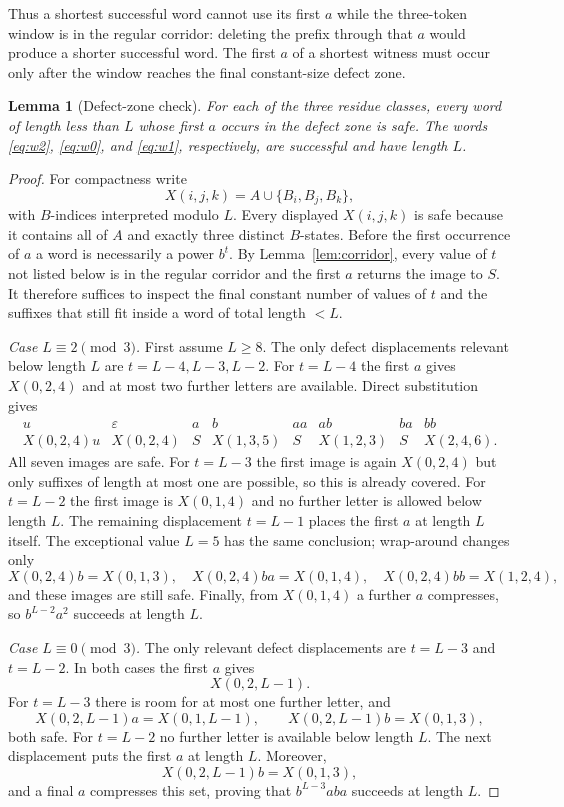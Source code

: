 \documentclass[11pt]{article}
\newtheorem{lemma}{Lemma}
\theoremstyle{definition}
\theoremstyle{remark}
\begin{document}
Thus a shortest successful word cannot use its first $a$ while the three-token window is in the regular corridor: deleting the prefix through that $a$ would produce a shorter successful word. The first $a$ of a shortest witness must occur only after the window reaches the final constant-size defect zone.

\begin{lemma}[Defect-zone check]\label{lem:defect}
For each of the three residue classes, every word of length less than $L$ whose first $a$ occurs in the defect zone is safe. The words \eqref{eq:w2}, \eqref{eq:w0}, and \eqref{eq:w1}, respectively, are successful and have length $L$.
\end{lemma}
\begin{proof}
For compactness write
\[
X(i,j,k)=A\cup\{B_i,B_j,B_k\},
\]
with $B$-indices interpreted modulo $L$. Every displayed $X(i,j,k)$ is safe because it contains all of $A$ and exactly three distinct $B$-states. Before the first occurrence of $a$ a word is necessarily a power $b^t$. By Lemma~\ref{lem:corridor}, every value of $t$ not listed below is in the regular corridor and the first $a$ returns the image to $S$. It therefore suffices to inspect the final constant number of values of $t$ and the suffixes that still fit inside a word of total length $<L$.

\smallskip
\noindent\emph{Case $L\equiv2\pmod3$.}
First assume $L\ge8$. The only defect displacements relevant below length $L$ are $t=L-4,L-3,L-2$. For $t=L-4$ the first $a$ gives $X(0,2,4)$ and at most two further letters are available. Direct substitution gives
\[
\begin{array}{c|ccccccc}
u&\varepsilon&a&b&aa&ab&ba&bb\\ \hline
X(0,2,4)u&X(0,2,4)&S&X(1,3,5)&S&X(1,2,3)&S&X(2,4,6).
\end{array}
\]
All seven images are safe. For $t=L-3$ the first image is again $X(0,2,4)$ but only suffixes of length at most one are possible, so this is already covered. For $t=L-2$ the first image is $X(0,1,4)$ and no further letter is allowed below length $L$. The remaining displacement $t=L-1$ places the first $a$ at length $L$ itself. The exceptional value $L=5$ has the same conclusion; wrap-around changes only
\[
X(0,2,4)b=X(0,1,3),\quad
X(0,2,4)ba=X(0,1,4),\quad
X(0,2,4)bb=X(1,2,4),
\]
and these images are still safe. Finally, from $X(0,1,4)$ a further $a$ compresses, so $b^{L-2}a^2$ succeeds at length $L$.

\smallskip
\noindent\emph{Case $L\equiv0\pmod3$.}
The only relevant defect displacements are $t=L-3$ and $t=L-2$. In both cases the first $a$ gives
\[
X(0,2,L-1).
\]
For $t=L-3$ there is room for at most one further letter, and
\[
X(0,2,L-1)a=X(0,1,L-1),\qquad
X(0,2,L-1)b=X(0,1,3),
\]
both safe. For $t=L-2$ no further letter is available below length $L$. The next displacement puts the first $a$ at length $L$. Moreover,
\[
X(0,2,L-1)b=X(0,1,3),
\]
and a final $a$ compresses this set, proving that $b^{L-3}aba$ succeeds at length $L$.


\end{proof}
\end{document}
